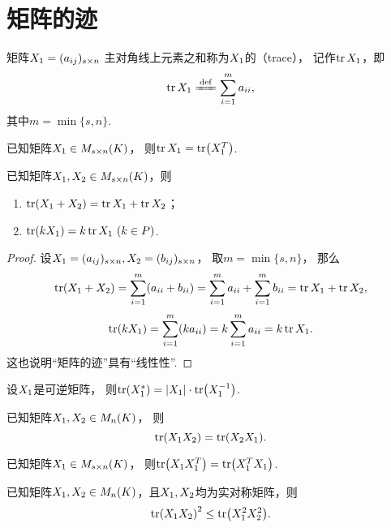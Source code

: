 \section{矩阵的迹}
\begin{definition}
矩阵\(X_1=(a_{ij})_{s \times n}\)
主对角线上元素之和称为\(X_1\)的（trace），
记作\(\tr X_1\)，即\[
	\tr\A \defeq \sum_{i=1}^m a_{ii},
\]
其中\(m = \min\{s,n\}\).
\end{definition}

\begin{property}
已知矩阵\(X_1 \in M_{s \times n}(K)\)，
则\(\tr X_1 = \tr(X_1^T)\).
\end{property}

\begin{property}
已知矩阵\(X_1,X_2 \in M_{s \times n}(K)\)，则
\begin{enumerate}
	\item \(\tr(X_1+X_2) = \tr X_1 + \tr X_2\)；
	\item \(\tr(k X_1) = k \tr X_1\ (k \in P)\).
\end{enumerate}
\begin{proof}
设\(X_1=(a_{ij})_{s \times n},
X_2=(b_{ij})_{s \times n}\)，
取\(m = \min\{s,n\}\)，
那么\[
	\tr(X_1+X_2) = \sum_{i=1}^m (a_{ii}+b_{ii})
	= \sum_{i=1}^m a_{ii}
	+ \sum_{i=1}^m b_{ii}
	= \tr X_1 + \tr X_2,
\]\[
	\tr(k X_1) = \sum_{i=1}^m (k a_{ii})
	= k \sum_{i=1}^m a_{ii}
	= k \tr X_1.
\]
这也说明“矩阵的迹”具有“线性性”.
\end{proof}
\end{property}

\begin{property}
设\(X_1\)是可逆矩阵，
则\(\tr(X_1^*) = \abs{X_1} \cdot \tr(X_1^{-1})\).
\end{property}

\begin{property}
已知矩阵\(X_1,X_2 \in M_n(K)\)，
则\[
	\tr(X_1X_2) = \tr(X_2X_1).
\]
\end{property}

\begin{property}
已知矩阵\(X_1 \in M_{s \times n}(K)\)，
则\(\tr(X_1X_1^T) = \tr(X_1^TX_1)\).
\end{property}

\begin{property}
已知矩阵\(X_1,X_2 \in M_n(K)\)，且\(X_1,X_2\)均为实对称矩阵，则\[
	\tr(X_1X_2)^2 \leq \tr(X_1^2X_2^2).
\]
\end{property}
